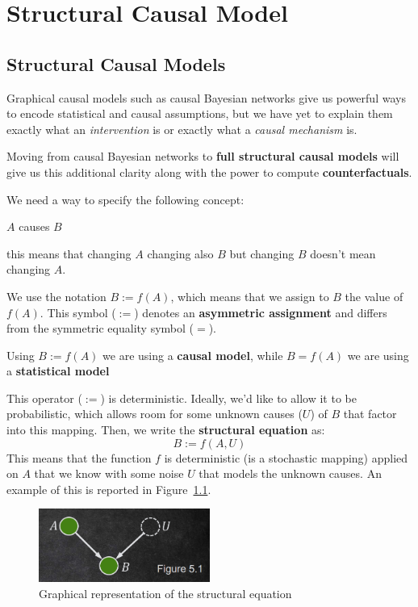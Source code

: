 \chapter{Structural Causal Model}
\section{Structural Causal Models}
Graphical causal models such as causal Bayesian networks give us powerful ways to
encode statistical and causal assumptions, but we have yet to explain them exactly
what an \textit{intervention} is or exactly what a \textit{causal mechanism} is.

Moving from causal Bayesian networks to \textbf{full structural causal models}
will give us this additional clarity along with the power to compute \textbf{counterfactuals}.

We need a way to specify the following concept:
\begin{center}
    $A$ causes $B$
\end{center}
this means that changing $A$ changing also $B$ but changing $B$ doesn't mean changing $A$.

We use the notation $B := f(A)$, which means that we assign to $B$ the value of
$f(A)$. This symbol ($:=$) denotes an \textbf{asymmetric assignment} and differs
from the symmetric equality symbol ($=$).

\begin{note}
    Using $B := f(A)$ we are using a \textbf{causal model}, while $B = f(A)$ we
    are using a \textbf{statistical model}
\end{note}

This operator ($:=$) is deterministic. Ideally, we'd like to allow it to be
probabilistic, which allows room for some unknown causes ($U$) of $B$ that factor
into this mapping. Then, we write the \textbf{structural equation} as:
\begin{equation*}
    B := f(A, U)
\end{equation*}
This means that the function $f$ is deterministic (is a stochastic mapping)
applied on $A$ that we know with some noise $U$ that models the unknown causes.
An example of this is reported in Figure~\ref{fig:unknown_graphs}.

\begin{figure}[!ht]
    \centering
    \includegraphics[width=0.5\textwidth]{img/structural_causal_model/unknown_graphs.png}
    \caption{Graphical representation of the structural equation}
    \label{fig:unknown_graphs}
\end{figure}

